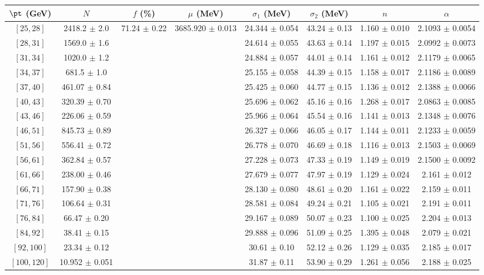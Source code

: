 \begin{tabular}{c||c|c|c|c|c|c|c}
$\pt$ (GeV) & $N$ & $f$ (\%) & $\mu$ (MeV) & $\sigma_1$ (MeV) & $\sigma_2$ (MeV) & $n$ & $\alpha$ \\
\hline
$[25, 28]$ & 2418.2 $\pm$ 2.0 & \multirow{17}{*}{71.24 $\pm$ 0.22} & \multirow{17}{*}{3685.920 $\pm$ 0.013} & 24.344 $\pm$ 0.054 & 43.24 $\pm$ 0.13 & 1.160 $\pm$ 0.010 & 2.1093 $\pm$ 0.0054\\
$[28, 31]$ & 1569.0 $\pm$ 1.6 &  &  & 24.614 $\pm$ 0.055 & 43.63 $\pm$ 0.14 & 1.197 $\pm$ 0.015 & 2.0992 $\pm$ 0.0073\\
$[31, 34]$ & 1020.0 $\pm$ 1.2 &  &  & 24.884 $\pm$ 0.057 & 44.01 $\pm$ 0.14 & 1.161 $\pm$ 0.012 & 2.1179 $\pm$ 0.0065\\
$[34, 37]$ & 681.5 $\pm$ 1.0 &  &  & 25.155 $\pm$ 0.058 & 44.39 $\pm$ 0.15 & 1.158 $\pm$ 0.017 & 2.1186 $\pm$ 0.0089\\
$[37, 40]$ & 461.07 $\pm$ 0.84 &  &  & 25.425 $\pm$ 0.060 & 44.77 $\pm$ 0.15 & 1.136 $\pm$ 0.012 & 2.1388 $\pm$ 0.0066\\
$[40, 43]$ & 320.39 $\pm$ 0.70 &  &  & 25.696 $\pm$ 0.062 & 45.16 $\pm$ 0.16 & 1.268 $\pm$ 0.017 & 2.0863 $\pm$ 0.0085\\
$[43, 46]$ & 226.06 $\pm$ 0.59 &  &  & 25.966 $\pm$ 0.064 & 45.54 $\pm$ 0.16 & 1.141 $\pm$ 0.013 & 2.1348 $\pm$ 0.0076\\
$[46, 51]$ & 845.73 $\pm$ 0.89 &  &  & 26.327 $\pm$ 0.066 & 46.05 $\pm$ 0.17 & 1.144 $\pm$ 0.011 & 2.1233 $\pm$ 0.0059\\
$[51, 56]$ & 556.41 $\pm$ 0.72 &  &  & 26.778 $\pm$ 0.070 & 46.69 $\pm$ 0.18 & 1.116 $\pm$ 0.013 & 2.1503 $\pm$ 0.0069\\
$[56, 61]$ & 362.84 $\pm$ 0.57 &  &  & 27.228 $\pm$ 0.073 & 47.33 $\pm$ 0.19 & 1.149 $\pm$ 0.019 & 2.1500 $\pm$ 0.0092\\
$[61, 66]$ & 238.00 $\pm$ 0.46 &  &  & 27.679 $\pm$ 0.077 & 47.97 $\pm$ 0.19 & 1.129 $\pm$ 0.024 & 2.161 $\pm$ 0.012\\
$[66, 71]$ & 157.90 $\pm$ 0.38 &  &  & 28.130 $\pm$ 0.080 & 48.61 $\pm$ 0.20 & 1.161 $\pm$ 0.022 & 2.159 $\pm$ 0.011\\
$[71, 76]$ & 106.64 $\pm$ 0.31 &  &  & 28.581 $\pm$ 0.084 & 49.24 $\pm$ 0.21 & 1.105 $\pm$ 0.021 & 2.191 $\pm$ 0.011\\
$[76, 84]$ & 66.47 $\pm$ 0.20 &  &  & 29.167 $\pm$ 0.089 & 50.07 $\pm$ 0.23 & 1.100 $\pm$ 0.025 & 2.204 $\pm$ 0.013\\
$[84, 92]$ & 38.41 $\pm$ 0.15 &  &  & 29.888 $\pm$ 0.096 & 51.09 $\pm$ 0.25 & 1.395 $\pm$ 0.048 & 2.079 $\pm$ 0.021\\
$[92, 100]$ & 23.34 $\pm$ 0.12 &  &  & 30.61 $\pm$ 0.10 & 52.12 $\pm$ 0.26 & 1.129 $\pm$ 0.035 & 2.185 $\pm$ 0.017\\
$[100, 120]$ & 10.952 $\pm$ 0.051 &  &  & 31.87 $\pm$ 0.11 & 53.90 $\pm$ 0.29 & 1.261 $\pm$ 0.056 & 2.188 $\pm$ 0.025\\
\end{tabular}
